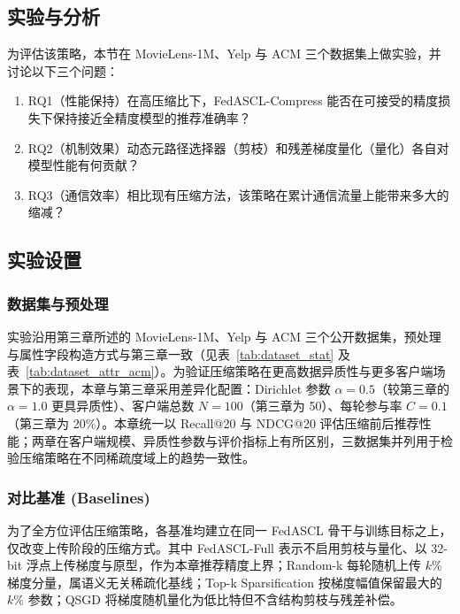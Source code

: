 \subsection{实验与分析}
\label{sec:exp_analysis_chap4}

为评估该策略，本节在 MovieLens-1M、Yelp 与 ACM 三个数据集上做实验，并讨论以下三个问题：
\begin{enumerate}[label=\arabic*., labelsep=0.08em, leftmargin=2.1em, labelwidth=1.65em, align=left]
    \item RQ1（性能保持）在高压缩比下，FedASCL-Compress 能否在可接受的精度损失下保持接近全精度模型的推荐准确率？
    \item RQ2（机制效果）动态元路径选择器（剪枝）和残差梯度量化（量化）各自对模型性能有何贡献？
    \item RQ3（通信效率）相比现有压缩方法，该策略在累计通信流量上能带来多大的缩减？
\end{enumerate}

\subsection{实验设置}

\subsubsection{数据集与预处理}
实验沿用第三章所述的 MovieLens-1M、Yelp 与 ACM 三个公开数据集，预处理与属性字段构造方式与第三章一致（见表~\ref{tab:dataset_stat} 及表~\ref{tab:dataset_attr_acm}）。为验证压缩策略在更高数据异质性与更多客户端场景下的表现，本章与第三章采用差异化配置：Dirichlet 参数 $\alpha=0.5$（较第三章的 $\alpha=1.0$ 更具异质性）、客户端总数 $N=100$（第三章为 50）、每轮参与率 $C=0.1$（第三章为 20\%）。本章统一以 Recall@20 与 NDCG@20 评估压缩前后推荐性能；两章在客户端规模、异质性参数与评价指标上有所区别，三数据集并列用于检验压缩策略在不同稀疏度域上的趋势一致性。

\subsubsection{对比基准 (Baselines)}
为了全方位评估压缩策略，各基准均建立在同一 FedASCL 骨干与训练目标之上，仅改变上传阶段的压缩方式。其中 FedASCL-Full 表示不启用剪枝与量化、以 32-bit 浮点上传梯度与原型，作为本章推荐精度上界；Random-k 每轮随机上传 $k\%$ 梯度分量，属语义无关稀疏化基线；Top-k Sparsification 按梯度幅值保留最大的 $k\%$ 参数\cite{jiang2022fedmp}；QSGD 将梯度随机量化为低比特但不含结构剪枝与残差补偿\cite{alistarh2017qsgd}。

